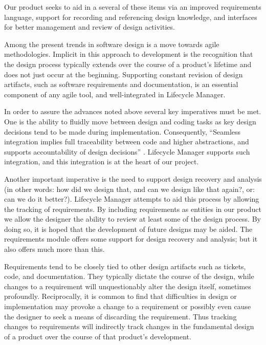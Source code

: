 \documentclass[letterpaper,10pt]{article}
\begin{document}
        Our product seeks to aid in a several of these items via
        an improved requirements language, support for recording
        and referencing design knowledge, and interfaces for
        better management and review of design activities.
        
        Among the present trends in software design is a move towards
        agile methodologies.  Implicit in this approach to development
        is the recognition that the design process typically extends
        over the course of a product's lifetime and does not just
        occur at the beginning. Supporting constant revision of design
        artifacts, such as software requirements and documentation, is
        an essential component of any agile tool, and well-integrated
        in Lifecycle Manager.

        In order to assure the advances noted above several key
        imperatives must be met.  One is the ability to fluidly move
        between design and coding tasks as key design decisions tend
        to be made during implementation.  Consequently, ``Seamless
        integration implies full traceability between code and higher
        abstractions, and supports accountability of design
        decisions'' \cite{taylor_hoek}.  Lifecycle Manager supports
        such integration, and this integration is at the heart of our
        project.

        Another important imperative is the need to support design
        recovery and analysis (in other words: how did we design that,
        and can we design like that again?, or: can we do it better?).
        Lifecycle Manager attempts to aid this process by allowing the
        tracking of requirements.  By including requirements as
        entities in our product we allow the designer the ability to
        review at least some of the design process.  By doing so, it
        is hoped that the development of future designs may be aided.
        The requirements module offers some support for design
        recovery and analysis; but it also offers much more than this.

        Requirements tend to be closely tied to other design artifacts
        such as tickets, code, and documentation.  They typically
        dictate the course of the design, while changes to a
        requirement will unquestionably alter the design itself,
        sometimes profoundly.  Reciprocally, it is common to find that
        difficulties in design or implementation may provoke a change
        to a requirement or possibly even cause the designer to seek a
        means of discarding the requirement.  Thus tracking changes to
        requirements will indirectly track changes in the fundamental
        design of a product over the course of that product's
        development.
\end{document}
